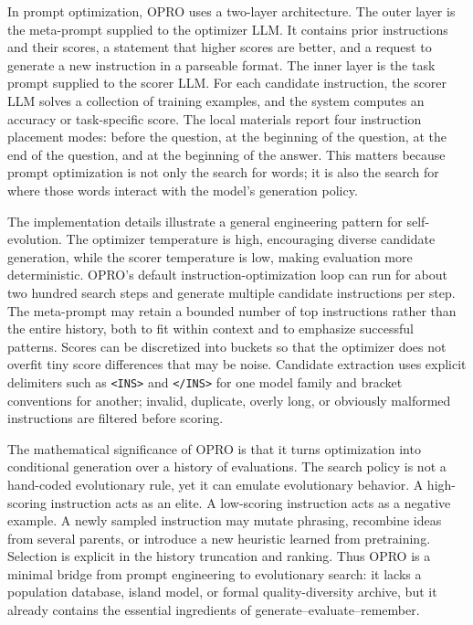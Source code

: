 In prompt optimization, OPRO uses a two-layer architecture.  The outer layer is the meta-prompt supplied to the optimizer LLM.  It contains prior instructions and their scores, a statement that higher scores are better, and a request to generate a new instruction in a parseable format.  The inner layer is the task prompt supplied to the scorer LLM.  For each candidate instruction, the scorer LLM solves a collection of training examples, and the system computes an accuracy or task-specific score.  The local materials report four instruction placement modes: before the question, at the beginning of the question, at the end of the question, and at the beginning of the answer.  This matters because prompt optimization is not only the search for words; it is also the search for where those words interact with the model's generation policy.

The implementation details illustrate a general engineering pattern for self-evolution.  The optimizer temperature is high, encouraging diverse candidate generation, while the scorer temperature is low, making evaluation more deterministic.  OPRO's default instruction-optimization loop can run for about two hundred search steps and generate multiple candidate instructions per step.  The meta-prompt may retain a bounded number of top instructions rather than the entire history, both to fit within context and to emphasize successful patterns.  Scores can be discretized into buckets so that the optimizer does not overfit tiny score differences that may be noise.  Candidate extraction uses explicit delimiters such as \texttt{<INS>} and \texttt{</INS>} for one model family and bracket conventions for another; invalid, duplicate, overly long, or obviously malformed instructions are filtered before scoring.

The mathematical significance of OPRO is that it turns optimization into conditional generation over a history of evaluations.  The search policy is not a hand-coded evolutionary rule, yet it can emulate evolutionary behavior.  A high-scoring instruction acts as an elite.  A low-scoring instruction acts as a negative example.  A newly sampled instruction may mutate phrasing, recombine ideas from several parents, or introduce a new heuristic learned from pretraining.  Selection is explicit in the history truncation and ranking.  Thus OPRO is a minimal bridge from prompt engineering to evolutionary search: it lacks a population database, island model, or formal quality-diversity archive, but it already contains the essential ingredients of generate--evaluate--remember.


